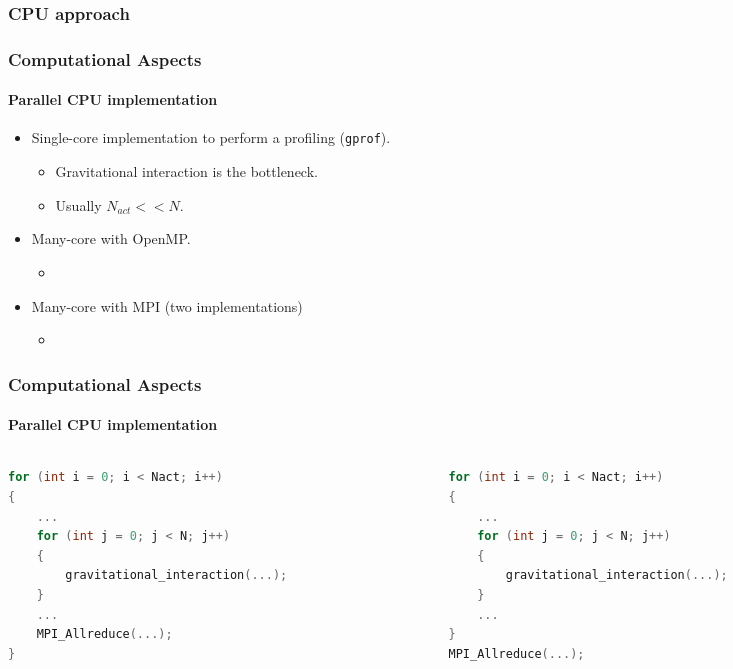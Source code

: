 \subsubsection{CPU approach}
\begin{frame}
    \frametitle{Computational Aspects}
    \framesubtitle{Parallel CPU implementation}
    \begin{itemize}
        \item Single-core implementation to perform a profiling (\texttt{gprof}).
        \begin{itemize}
            \item Gravitational interaction is the bottleneck.
            \item Usually $N_{act} << N$.
        \end{itemize}
        \item Many-core with OpenMP.
        \begin{itemize}
            \item {}
        \end{itemize}
        \item Many-core with MPI (two implementations)
        \begin{itemize}
            \item {}
        \end{itemize}
    \end{itemize}
\end{frame}

\begin{frame}[fragile]
    \frametitle{Computational Aspects}
    \framesubtitle{Parallel CPU implementation}

    \begin{columns}
        \begin{column}{0.45\textwidth}
            \begin{lstlisting}[language=C,caption={Reduce every $Nact$ particle}]
for (int i = 0; i < Nact; i++)
{
    ...
    for (int j = 0; j < N; j++)
    {
        gravitational_interaction(...);
    }
    ...
    MPI_Allreduce(...);
}
            \end{lstlisting}
        \end{column}
        \begin{column}{0.45\textwidth}
            \begin{lstlisting}[language=C,caption={Reduce all $Nact$ particle}]
for (int i = 0; i < Nact; i++)
{
    ...
    for (int j = 0; j < N; j++)
    {
        gravitational_interaction(...);
    }
    ...
}
MPI_Allreduce(...);
            \end{lstlisting}
        \end{column}
    \end{columns}
\end{frame}

